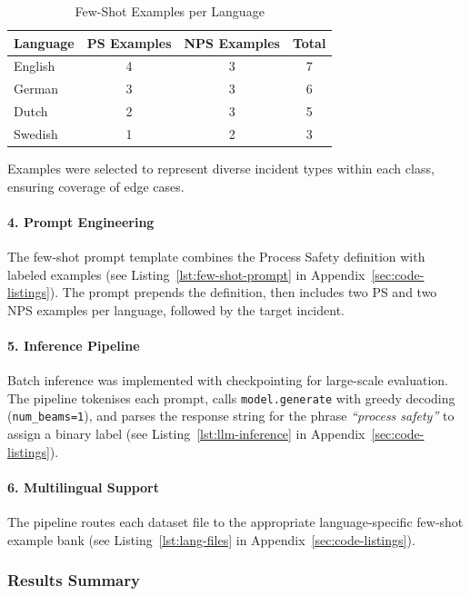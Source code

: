 \documentclass[11pt, titlepage, bibliography=totoc]{scrreprt}
\begin{document}
\begin{table}[htbp]
\centering
\caption{Few-Shot Examples per Language}
\label{tab:few-shot-examples}
\begin{tabular}{@{}lccc@{}}
\toprule
\textbf{Language} & \textbf{PS Examples} & \textbf{NPS Examples} & \textbf{Total} \\
\midrule
English & 4 & 3 & 7 \\
German & 3 & 3 & 6 \\
Dutch & 2 & 3 & 5 \\
Swedish & 1 & 2 & 3 \\
\bottomrule
\end{tabular}
\end{table}

Examples were selected to represent diverse incident types within each class, ensuring coverage of edge cases.

\paragraph{4. Prompt Engineering}
The few-shot prompt template combines the Process Safety definition with labeled examples (see Listing~\ref{lst:few-shot-prompt} in Appendix~\ref{sec:code-listings}). The prompt prepends the definition, then includes two PS and two NPS examples per language, followed by the target incident.

\paragraph{5. Inference Pipeline}
Batch inference was implemented with checkpointing for large-scale evaluation. The pipeline tokenises each prompt, calls \texttt{model.generate} with greedy decoding (\texttt{num\_beams=1}), and parses the response string for the phrase \textit{``process safety''} to assign a binary label (see Listing~\ref{lst:llm-inference} in Appendix~\ref{sec:code-listings}).

\paragraph{6. Multilingual Support}
The pipeline routes each dataset file to the appropriate language-specific few-shot example bank (see Listing~\ref{lst:lang-files} in Appendix~\ref{sec:code-listings}).

\subsubsection{Results Summary}
\end{document}

